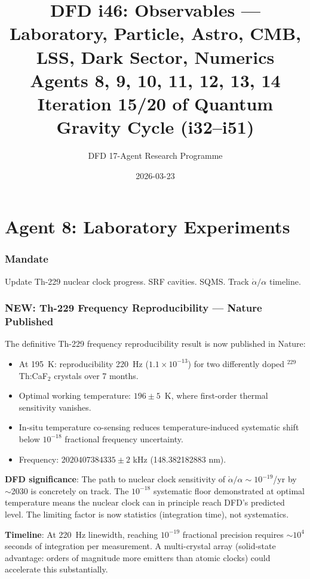 \documentclass[11pt,a4paper]{article}
\title{DFD i46: Observables --- Laboratory, Particle, Astro, CMB, LSS, Dark Sector, Numerics\\[6pt]
\large Agents 8, 9, 10, 11, 12, 13, 14\\[6pt]
\normalsize Iteration 15/20 of Quantum Gravity Cycle (i32--i51)}
\author{DFD 17-Agent Research Programme}
\date{2026-03-23}
\newcommand{\NEW}{\textcolor{dfdblue}{\textbf{NEW}}}
\begin{document}
\maketitle
\tableofcontents
\newpage

\part{Agent 8: Laboratory Experiments}
\label{part:agent8}

\section{Mandate}

Update Th-229 nuclear clock progress. SRF cavities. SQMS. Track $\dot{\alpha}/\alpha$ timeline.

\section{\NEW: Th-229 Frequency Reproducibility --- Nature Published}

\begin{tcolorbox}[colback=green!5!white, colframe=green!60!black,
  title={Nature (January 2026): Solid-State Th-229 Clock Frequency Reproducibility}]

The definitive Th-229 frequency reproducibility result is now published in Nature:
\begin{itemize}
\item At 195~K: reproducibility 220~Hz ($1.1 \times 10^{-13}$) for two differently doped $^{229}$Th:CaF$_2$ crystals over 7 months.
\item Optimal working temperature: $196 \pm 5$~K, where first-order thermal sensitivity vanishes.
\item In-situ temperature co-sensing reduces temperature-induced systematic shift below $10^{-18}$ fractional frequency uncertainty.
\item Frequency: $2020407384335 \pm 2$ kHz (148.382182883 nm).
\end{itemize}

\textbf{DFD significance}: The path to nuclear clock sensitivity of $\dot{\alpha}/\alpha \sim 10^{-19}$/yr by $\sim$2030 is concretely on track. The $10^{-18}$ systematic floor demonstrated at optimal temperature means the nuclear clock can in principle reach DFD's predicted level. The limiting factor is now statistics (integration time), not systematics.

\textbf{Timeline}: At 220~Hz linewidth, reaching $10^{-19}$ fractional precision requires $\sim 10^4$ seconds of integration per measurement. A multi-crystal array (solid-state advantage: orders of magnitude more emitters than atomic clocks) could accelerate this substantially.
\end{tcolorbox}
\end{document}
